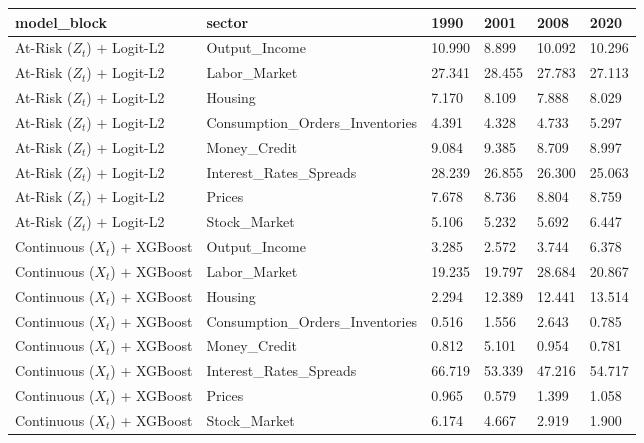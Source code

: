 \begin{tabular}{llllll}
\toprule
model_block & sector & 1990 & 2001 & 2008 & 2020 \\
\midrule
At-Risk ($Z_t$) + Logit-L2 & Output_Income & 10.990 & 8.899 & 10.092 & 10.296 \\
At-Risk ($Z_t$) + Logit-L2 & Labor_Market & 27.341 & 28.455 & 27.783 & 27.113 \\
At-Risk ($Z_t$) + Logit-L2 & Housing & 7.170 & 8.109 & 7.888 & 8.029 \\
At-Risk ($Z_t$) + Logit-L2 & Consumption_Orders_Inventories & 4.391 & 4.328 & 4.733 & 5.297 \\
At-Risk ($Z_t$) + Logit-L2 & Money_Credit & 9.084 & 9.385 & 8.709 & 8.997 \\
At-Risk ($Z_t$) + Logit-L2 & Interest_Rates_Spreads & 28.239 & 26.855 & 26.300 & 25.063 \\
At-Risk ($Z_t$) + Logit-L2 & Prices & 7.678 & 8.736 & 8.804 & 8.759 \\
At-Risk ($Z_t$) + Logit-L2 & Stock_Market & 5.106 & 5.232 & 5.692 & 6.447 \\
Continuous ($X_t$) + XGBoost & Output_Income & 3.285 & 2.572 & 3.744 & 6.378 \\
Continuous ($X_t$) + XGBoost & Labor_Market & 19.235 & 19.797 & 28.684 & 20.867 \\
Continuous ($X_t$) + XGBoost & Housing & 2.294 & 12.389 & 12.441 & 13.514 \\
Continuous ($X_t$) + XGBoost & Consumption_Orders_Inventories & 0.516 & 1.556 & 2.643 & 0.785 \\
Continuous ($X_t$) + XGBoost & Money_Credit & 0.812 & 5.101 & 0.954 & 0.781 \\
Continuous ($X_t$) + XGBoost & Interest_Rates_Spreads & 66.719 & 53.339 & 47.216 & 54.717 \\
Continuous ($X_t$) + XGBoost & Prices & 0.965 & 0.579 & 1.399 & 1.058 \\
Continuous ($X_t$) + XGBoost & Stock_Market & 6.174 & 4.667 & 2.919 & 1.900 \\
\bottomrule
\end{tabular}
